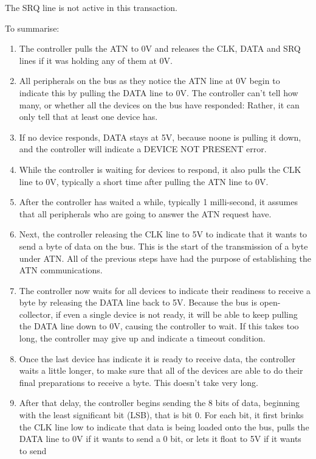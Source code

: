 The SRQ line is not active in this transaction.

To summarise:

\begin{enumerate}
\item The controller pulls the ATN to 0V and releases the CLK, DATA
  and SRQ lines if it was holding any of them at 0V.
\item All peripherals on the bus as they notice the ATN line at 0V
  begin to indicate this by pulling the DATA line to 0V.
  The controller can't tell how many, or whether all the devices
  on the bus have responded: Rather, it can only tell that at least
  one device has.
\item If no device responds, DATA stays at 5V, because noone is
  pulling it down, and the
  controller will indicate a DEVICE NOT PRESENT error.
\item While the controller is waiting for devices to respond, it
  also pulls the CLK line to 0V, typically a short time after
  pulling the ATN line to 0V.
\item After the controller has waited a while, typically 1
  milli-second, it assumes that all peripherals who are going to
  answer the ATN request have.
\item Next, the controller releasing the CLK line to 5V to indicate
  that it wants to send a byte of data on the bus. This is the start
  of the transmission of a byte under ATN. All of the previous steps
  have had the purpose of establishing the ATN communications.
\item The controller now waits for all devices to indicate
  their readiness to receive a byte by releasing the DATA line
  back to 5V. Because the bus is open-collector, if even a
  single device is not ready, it will be able to keep pulling
  the DATA line down to 0V, causing the controller to wait.
  If this takes too long, the controller may give up and
  indicate a timeout condition.
\item Once the last device has indicate it is ready to receive data,
  the controller waits a little longer, to make sure that all of the
  devices are able to do their final preparations to receive a
  byte. This doesn't take very long.
\item After that delay, the controller begins sending the 8 bits of
  data, beginning with the least significant bit (LSB), that is bit
  0. For each bit, it first brinks the CLK line low to indicate that
  data is being loaded onto the bus, pulls the DATA line to 0V if it
  wants to send a 0 bit, or lets it float to 5V if it wants to send

\end{enumerate}

